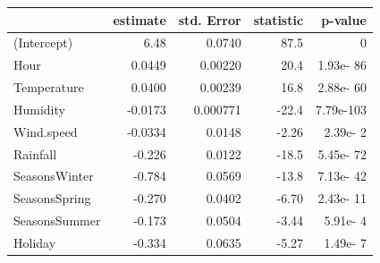 \documentclass[12 pt]{scrartcl}
\begin{document}
\begin{table}[ht]
\centering
{}
\label{tab:summary}
\begin{tabular}{l|rrrr}
 & \textbf{estimate} & \textbf{std. Error} & \textbf{statistic} & \textbf{p-value}\\ 
  \hline
(Intercept) & 6.48   & 0.0740    & 87.5  & 0 \\ 
  Hour & 0.0449  & 0.00220      & 20.4  & 1.93e- 86\\ 
  Temperature & 0.0400  & 0.00239      & 16.8  & 2.88e- 60\\ 
  Humidity &  -0.0173  & 0.000771    & -22.4  & 7.79e-103\\ 
  Wind.speed &  -0.0334  & 0.0148     &  -2.26 & 2.39e-  2\\ 
  Rainfall &  -0.226  & 0.0122    &  -18.5  & 5.45e- 72\\ 
  SeasonsWinter &  -0.784  & 0.0569     & -13.8  & 7.13e- 42\\ 
  SeasonsSpring &  -0.270  & 0.0402     &  -6.70  & 2.43e- 11\\ 
  SeasonsSummer     &    -0.173  & 0.0504      & -3.44 & 5.91e-  4 \\
  Holiday &  -0.334  & 0.0635      & -5.27 & 1.49e-  7 \\ 
\end{tabular}
\end{table}
\end{document}
